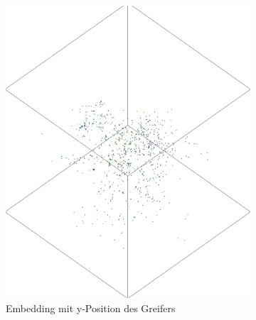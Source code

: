 	
	  \begin{figure}[h]
		\centering
		\begin{subfigure}[c]{0.49\textwidth}			
			\includegraphics[width=1\textwidth,center]{bilder/Hauptteil/Autoencoder_Grappel_Detection/y_embKopie.png}
			\caption{Embedding mit y-Position des Greifers}
			\label{img:Emb_y_AE}	
		\end{subfigure}
		\begin{subfigure}[c]{0.49\textwidth}			

\end{subfigure}
\end{figure}

